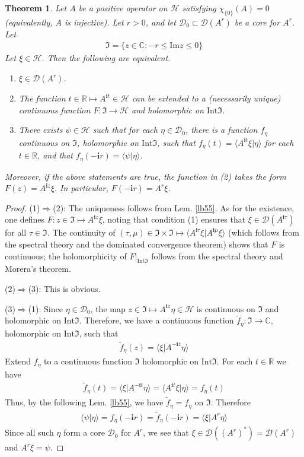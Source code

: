 \documentclass[12pt,b5paper,notitlepage]{article}
\theoremstyle{definition}
\theoremstyle{plain}
\newtheorem{thm}[df]{Theorem}
\newcommand{\fk}{\mathfrak}
\newcommand{\mc}{\mathcal}
\newcommand{\wtd}{\widetilde}
\newcommand{\ovl}{\overline}
\newcommand{\Dom}{\scr{D}}
\newcommand{\bk}[1]{\langle {#1}\rangle}
\newcommand{\scr}{\mathscr}
\newcommand{\im}{\mathbf{i}}
\newcommand{\Cbb}{\mathbb C}
\newcommand{\Rbb}{\mathbb R}
\newcommand{\Imag}{\mathrm{Im}}
\newcommand{\Int}{\mathrm{Int}}
\numberwithin{equation}{section}
\begin{document}
\begin{thm}\label{lb56}
Let $A$ be a positive operator on $\mc H$ satisfying $\chi_{\{0\}}(A)=0$ (equivalently, $A$ is injective). Let $r>0$, and let $\Dom_0\subset\Dom(A^r)$ be a core for $A^r$. Let 
\begin{align*}
\fk I=\{z\in\Cbb:-r\leq\Imag z\leq0\}
\end{align*}
Let $\xi\in\mc H$. Then the following are equivalent.
\begin{enumerate}[label=(\arabic*)]
\item $\xi\in\Dom(A^r)$.
\item The function $t\in\Rbb\mapsto A^{\im t}\in\mc H$ can be extended to a (necessarily unique) continuous function $F:\fk I\rightarrow\mc H$ and holomorphic on $\Int\fk I$.
\item There exists $\psi\in\mc H$ such that for each $\eta\in\Dom_0$, there is a function $f_\eta$ continuous on $\fk I$, holomorphic on $\Int\fk I$, such that $f_\eta(t)=\bk{A^{\im t}\xi|\eta}$ for each $t\in\Rbb$, and that $f_\eta(-\im r)=\bk{\psi|\eta}$.
\end{enumerate}
Moreover, if the above statements are true, the function in (2) takes the form $F(z)=A^{\im z}\xi$. In particular, $F(-\im r)=A^r\xi$.
\end{thm}


\begin{proof}
(1)$\Rightarrow$(2): The uniqueness follows from Lem. \ref{lb55}. As for the existence, one defines $F:z\in\fk I\mapsto A^{\im z}\xi$, noting that condition (1) ensures that $\xi\in\Dom(A^{\im\tau})$ for all $\tau\in\fk I$. The continuity of $(\tau,\mu)\in\fk I\times\fk I\mapsto \bk{A^{\im\tau}\xi|A^{\im\mu}\xi}$ (which follows from the spectral theory and the dominated convergence theorem) shows that $F$ is continuous; the holomorphicity of $F|_{\Int\fk I}$ follows from the spectral theory and Morera's theorem.

(2)$\Rightarrow$(3): This is obvious. 

(3)$\Rightarrow$(1): Since $\eta\in\Dom_0$, the map $z\in\fk I\mapsto A^{\im z}\eta\in\mc H$ is continuous on $\fk I$ and holomorphic on $\Int\fk I$. Therefore, we have a continuous function $\wtd f_\eta:\fk I\rightarrow\Cbb$, holomorphic on $\Int\fk I$, such that
\begin{align*}
\wtd f_\eta(z)=\bk{\xi|A^{-\im\ovl z}\eta}
\end{align*}
Extend $f_\eta$ to a continuous function $\fk I$ holomorphic on $\Int\fk I$. For each $t\in\Rbb$ we have
\begin{align*}
\wtd f_\eta(t)=\bk{\xi|A^{-\im t}\eta}=\bk{A^{\im t}\xi|\eta}=f_\eta(t)
\end{align*}
Thus, by the following Lem. \ref{lb55}, we have $\wtd f_\eta=f_\eta$ on $\fk I$. Therefore
\begin{align*}
\bk{\psi|\eta}=f_\eta(-\im r)=\wtd f_\eta(-\im r)=\bk{\xi|A^r\eta}
\end{align*}
Since all such $\eta$ form a core $\Dom_0$ for $A^r$, we see that $\xi\in\Dom((A^r)^*)=\Dom(A^r)$ and $A^r\xi=\psi$.
\end{proof}
\end{document}
